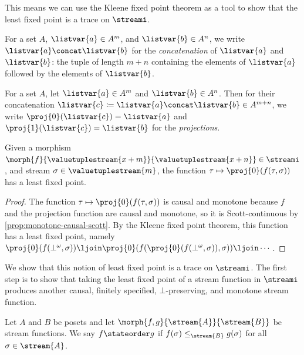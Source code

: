 \documentclass{lmcs}
\begin{document}
This means we can use the Kleene fixed point theorem as a tool to show that the
least fixed point is a trace on \(\streami\).

\begin{nota}[Concatenation]
    For a set \(A\), \(\listvar{a} \in A^m\), and \(\listvar{b} \in A^n\), we
    write \(\listvar{a} \concat \listvar{b}\) for the \emph{concatenation}
    of \(\listvar{a}\) and \(\listvar{b}\): the tuple of length \(m+n\)
    containing the elements of \(\listvar{a}\) followed by the elements of
    \(\listvar{b}\).
\end{nota}

\begin{nota}[Projection]
    For a set \(A\), let \(\listvar{a} \in A^m\) and \(\listvar{b} \in A^n\).
    Then for their concatenation \(
    \listvar{c} \coloneqq \listvar{a} \concat \listvar{b} \in A^{m+n}\),
    we write \(\proj{0}(\listvar{c}) = \listvar{a}\) and
    \(\proj{1}(\listvar{c}) = \listvar{b}\) for the \emph{projections}.
\end{nota}

\begin{lem}\label{lem:lfp-stream-function}
    Given a morphism \(
    \morph{f}{\valuetuplestream{x+m}}{\valuetuplestream{x+n}}
    \in \streami
    \), and stream \(\sigma \in \valuetuplestream{m}\), the function \(
    \tau \mapsto \proj{0}\mleft(f(\tau,\sigma)\mright)
    \) has a least fixed point.
\end{lem}
\begin{proof}
    The function \(\tau \mapsto \proj{0}\mleft(f(\tau,\sigma)\mright)\) is
    causal and monotone because \(f\) and the projection function are
    causal and monotone, so it is Scott-continuous by
    \autoref{prop:monotone-causal-scott}.
    By the Kleene fixed point theorem, this function has a least fixed point,
    namely \(
    \proj{0}\mleft(f(\bot^\omega, \sigma)\mright) \ljoin
    \proj{0}\mleft(f(\proj{0}\mleft(f(\bot^\omega, \sigma)\mright), \sigma)\mright) \ljoin
    \cdots
    \).
\end{proof}

We show that this notion of least fixed point is a trace on \(\streami\).
The first step is to show that taking the least fixed point of a stream function
in \(\streami\) produces another causal, finitely specified,
\(\bot\)-preserving, and monotone stream function.

\begin{defi}\label{def:state-order}
    Let \(A\) and \(B\) be posets and let
    \(\morph{f, g}{\stream{A}}{\stream{B}}\) be stream functions.
    We say \(f \stateorder g\) if \(f(\sigma) \leq_{\stream{B}} g(\sigma)\)
    for all \(\sigma \in \stream{A}\).
\end{defi}
\end{document}
